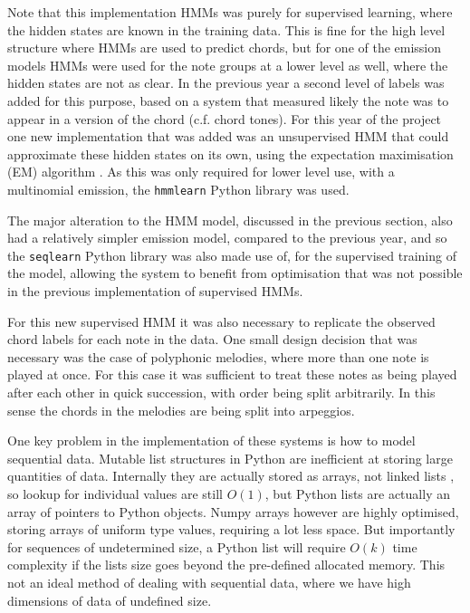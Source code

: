 \documentclass[bsc,singlespacing,logo, parskip, deptreport]{infthesis}
\begin{document}
Note that this implementation HMMs was purely for supervised learning, where the hidden states are known in the training data. This is fine for the high level structure where HMMs are used to predict chords, but for one of the emission models HMMs were used for the note groups at a lower level as well, where the hidden states are not as clear. In the previous year a second level of labels was added for this purpose, based on a system that measured likely the note was to appear in a version of the chord (c.f. chord tones). For this year of the project one new implementation that was added was an unsupervised HMM that could approximate these hidden states on its own, using the expectation maximisation (EM) algorithm \cite{moon1996expectation}. As this was only required for lower level use, with a multinomial emission, the {\tt hmmlearn} \cite{lebedev_2015} Python library was used.

The major alteration to the HMM model, discussed in the previous section, also had a relatively simpler emission model, compared to the previous year, and so the {\tt seqlearn} Python library \cite{buitinck} was also made use of, for the supervised training of the model, allowing the system to benefit from optimisation that was not possible in the previous implementation of supervised HMMs.

For this new supervised HMM it was also necessary to replicate the observed chord labels for each note in the data. One small design decision that was necessary was the case of polyphonic melodies, where more than one note is played at once. For this case it was sufficient to treat these notes as being played after each other in quick succession, with order being split arbitrarily. In this sense the chords in the melodies are being split into arpeggios.

One key problem in the implementation of these systems is how to model sequential data. Mutable list structures in Python are inefficient at storing large quantities of data. Internally they are actually stored as arrays, not linked lists \cite{rockyb_2015}, so lookup for individual values are still $O(1)$, but Python lists are actually an array of pointers to Python objects. Numpy arrays \cite{numpy_2005} however are highly optimised, storing arrays of uniform type values, requiring a lot less space. But importantly for sequences of undetermined size, a Python list will require $O(k)$ time complexity if the lists size goes beyond the pre-defined allocated memory. This not an ideal method of dealing with sequential data, where we have high dimensions of data of undefined size.
\end{document}
